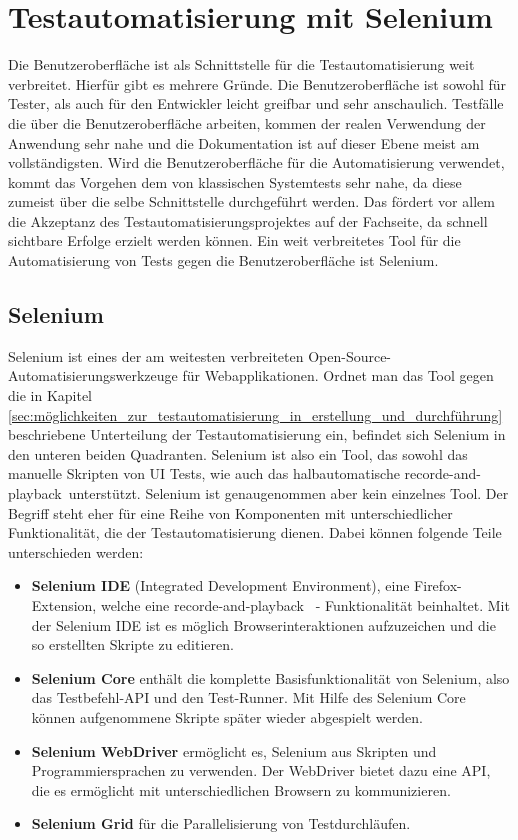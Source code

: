 \chapter{Testautomatisierung mit Selenium}
\label{sec:testautomatisierung_mit_selenium}
Die Benutzeroberfläche ist als Schnittstelle für die Testautomatisierung weit verbreitet. Hierfür gibt es mehrere Gründe. Die Benutzeroberfläche ist sowohl für Tester, als auch für den Entwickler leicht greifbar und sehr anschaulich. Testfälle die über die Benutzeroberfläche arbeiten, kommen der realen Verwendung der Anwendung sehr nahe und die Dokumentation ist auf dieser Ebene meist am vollständigsten. Wird die Benutzeroberfläche für die Automatisierung verwendet, kommt das Vorgehen dem von klassischen Systemtests sehr nahe, da diese zumeist über die selbe Schnittstelle durchgeführt werden. \cite[vgl. Seite 48]{seidl_basiswissen_2012} Das fördert vor allem die Akzeptanz des Testautomatisierungsprojektes auf der Fachseite, da schnell sichtbare Erfolge erzielt werden können. 
Ein weit verbreitetes Tool für die Automatisierung von Tests gegen die Benutzeroberfläche ist Selenium.

\section{Selenium}
\label{sec:selenium}
Selenium \cite{selenium_selenium_????} ist eines der am weitesten verbreiteten Open-Source-Automatisierungswerkzeuge für Webapplikationen. Ordnet man das Tool gegen die in Kapitel \ref{sec:möglichkeiten_zur_testautomatisierung_in_erstellung_und_durchführung} beschriebene Unterteilung der Testautomatisierung ein, befindet sich Selenium in den unteren beiden Quadranten.
Selenium ist also ein Tool, das sowohl das manuelle Skripten von UI Tests, wie auch das halbautomatische \glqq recorde-and-playback\grqq\ unterstützt. Selenium ist genaugenommen aber kein einzelnes Tool. Der Begriff steht eher für eine Reihe von Komponenten mit unterschiedlicher Funktionalität, die der Testautomatisierung dienen. Dabei können folgende Teile unterschieden werden:

\begin{itemize}
	  \itemsep0pt
      \item \textbf{Selenium IDE} (Integrated Development Environment), eine Firefox-Extension, welche eine \glqq recorde-and-playback \grqq\ - Funktionalität beinhaltet. Mit der Selenium IDE ist es möglich Browserinteraktionen aufzuzeichen und die so erstellten Skripte zu editieren.
      \item \textbf{Selenium Core} enthält die komplette Basisfunktionalität von Selenium, also das Testbefehl-API und den Test-Runner. Mit Hilfe des Selenium Core können aufgenommene Skripte später wieder abgespielt werden.
      \item \textbf{Selenium WebDriver} ermöglicht es, Selenium aus Skripten und Programmiersprachen zu verwenden. Der WebDriver bietet dazu eine API, die es ermöglicht mit unterschiedlichen Browsern zu kommunizieren.
      \item \textbf{Selenium Grid} für die Parallelisierung von Testdurchläufen.     
\end{itemize}


